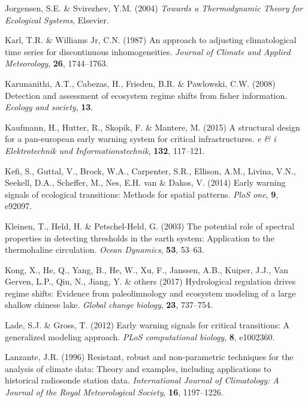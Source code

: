 \documentclass[12pt,twoside,openany]{reedthesis}
\begin{document}
\leavevmode\hypertarget{ref-jorgensen_towards_2004}{}%
Jorgensen, S.E. \& Svirezhev, Y.M. (2004) \emph{Towards a Thermodynamic Theory for Ecological Systems}, Elsevier.

\leavevmode\hypertarget{ref-karl1987approach}{}%
Karl, T.R. \& Williams Jr, C.N. (1987) An approach to adjusting climatological time series for discontinuous inhomogeneities. \emph{Journal of Climate and Applied Meteorology}, \textbf{26}, 1744--1763.

\leavevmode\hypertarget{ref-karunanithi_detection_2008}{}%
Karunanithi, A.T., Cabezas, H., Frieden, B.R. \& Pawlowski, C.W. (2008) Detection and assessment of ecosystem regime shifts from fisher information. \emph{Ecology and society}, \textbf{13}.

\leavevmode\hypertarget{ref-kaufmann2015structural}{}%
Kaufmann, H., Hutter, R., Skopik, F. \& Mantere, M. (2015) A structural design for a pan-european early warning system for critical infrastructures. \emph{e \& i Elektrotechnik und Informationstechnik}, \textbf{132}, 117--121.

\leavevmode\hypertarget{ref-kefi2014early}{}%
Kefi, S., Guttal, V., Brock, W.A., Carpenter, S.R., Ellison, A.M., Livina, V.N., Seekell, D.A., Scheffer, M., Nes, E.H. van \& Dakos, V. (2014) Early warning signals of ecological transitions: Methods for spatial patterns. \emph{PloS one}, \textbf{9}, e92097.

\leavevmode\hypertarget{ref-kleinen2003potential}{}%
Kleinen, T., Held, H. \& Petschel-Held, G. (2003) The potential role of spectral properties in detecting thresholds in the earth system: Application to the thermohaline circulation. \emph{Ocean Dynamics}, \textbf{53}, 53--63.

\leavevmode\hypertarget{ref-kong2017hydrological}{}%
Kong, X., He, Q., Yang, B., He, W., Xu, F., Janssen, A.B., Kuiper, J.J., Van Gerven, L.P., Qin, N., Jiang, Y. \& others (2017) Hydrological regulation drives regime shifts: Evidence from paleolimnology and ecosystem modeling of a large shallow chinese lake. \emph{Global change biology}, \textbf{23}, 737--754.

\leavevmode\hypertarget{ref-lade2012early}{}%
Lade, S.J. \& Gross, T. (2012) Early warning signals for critical transitions: A generalized modeling approach. \emph{PLoS computational biology}, \textbf{8}, e1002360.

\leavevmode\hypertarget{ref-lanzante1996resistant}{}%
Lanzante, J.R. (1996) Resistant, robust and non-parametric techniques for the analysis of climate data: Theory and examples, including applications to historical radiosonde station data. \emph{International Journal of Climatology: A Journal of the Royal Meteorological Society}, \textbf{16}, 1197--1226.
\end{document}
